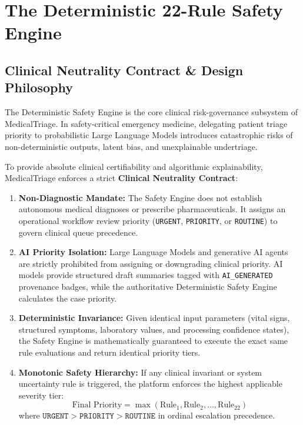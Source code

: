\documentclass[11pt,a4paper,oneside]{report}
\begin{document}
\chapter{The Deterministic 22-Rule Safety Engine}

\section{Clinical Neutrality Contract \& Design Philosophy}
The Deterministic Safety Engine is the core clinical risk-governance subsystem of MedicalTriage. In safety-critical emergency medicine, delegating patient triage priority to probabilistic Large Language Models introduces catastrophic risks of non-deterministic outputs, latent bias, and unexplainable undertriage.

To provide absolute clinical certifiability and algorithmic explainability, MedicalTriage enforces a strict \textbf{Clinical Neutrality Contract}:
\begin{enumerate}[leftmargin=20pt]
  \item \textbf{Non-Diagnostic Mandate:} The Safety Engine does not establish autonomous medical diagnoses or prescribe pharmaceuticals. It assigns an operational workflow review priority (\texttt{URGENT}, \texttt{PRIORITY}, or \texttt{ROUTINE}) to govern clinical queue precedence.
  \item \textbf{AI Priority Isolation:} Large Language Models and generative AI agents are strictly prohibited from assigning or downgrading clinical priority. AI models provide structured draft summaries tagged with \texttt{AI\_GENERATED} provenance badges, while the authoritative Deterministic Safety Engine calculates the case priority.
  \item \textbf{Deterministic Invariance:} Given identical input parameters (vital signs, structured symptoms, laboratory values, and processing confidence states), the Safety Engine is mathematically guaranteed to execute the exact same rule evaluations and return identical priority tiers.
  \item \textbf{Monotonic Safety Hierarchy:} If any clinical invariant or system uncertainty rule is triggered, the platform enforces the highest applicable severity tier:
  \begin{equation}
    \text{Final Priority} = \max(\text{Rule}_1, \text{Rule}_2, \dots, \text{Rule}_{22})
  \end{equation}
  where $\texttt{URGENT} > \texttt{PRIORITY} > \texttt{ROUTINE}$ in ordinal escalation precedence.
\end{enumerate}
\end{document}
